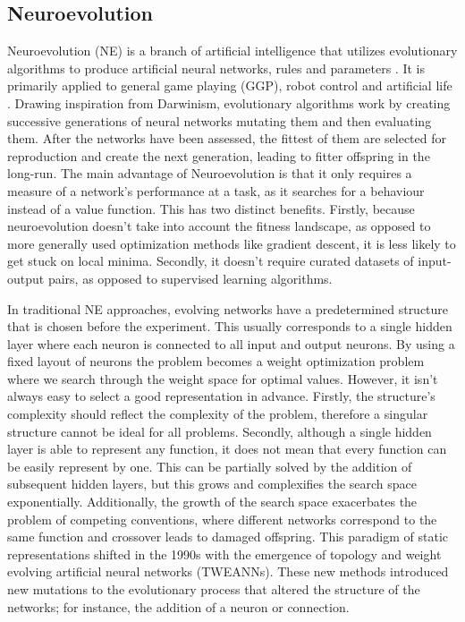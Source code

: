 \documentclass[letterpaper, 12pt]{article}
\begin{document}
\subsection*{Neuroevolution}
Neuroevolution (NE) is a branch of artificial intelligence that utilizes evolutionary
algorithms to produce artificial neural networks, rules and parameters \cite{neuro19}.
It is primarily applied to general game playing (GGP), robot control and artificial life
\cite{neurogames}. Drawing inspiration from Darwinism, evolutionary algorithms work by
creating successive generations of neural networks mutating them and then evaluating
them. After the networks have been assessed, the fittest of them are selected for
reproduction and create the next generation, leading to fitter offspring in the
long-run. The main advantage of Neuroevolution is that it only requires a measure of a
network's performance at a task, as it searches for a behaviour instead of a value
function. This has two distinct benefits. Firstly, because neuroevolution doesn't take
into account the fitness landscape, as opposed to more generally used optimization
methods like gradient descent, it is less likely to get stuck on local minima. Secondly,
it doesn't require curated datasets of input-output pairs, as opposed to supervised
learning algorithms.

In traditional NE approaches, evolving networks have a predetermined structure that is
chosen before the experiment. This usually corresponds to a single hidden layer where
each neuron is connected to all input and output neurons. By using a fixed layout of
neurons the problem becomes a weight optimization problem where we search through the
weight space for optimal values. However, it isn't always easy to select a good
representation in advance. Firstly, the structure's complexity should reflect the
complexity of the problem, therefore a singular structure cannot be ideal for all
problems. Secondly, although a single hidden layer is able to represent any function, it
does not mean that every function can be easily represent by one. This can be partially
solved by the addition of subsequent hidden layers, but this grows and complexifies the
search space exponentially. Additionally, the growth of the search space exacerbates the
problem of competing conventions, where different networks correspond to the same
function and crossover leads to damaged offspring. This paradigm of static
representations shifted in the 1990s with the emergence of topology and weight evolving
artificial neural networks (TWEANNs). These new methods introduced new mutations to the
evolutionary process that altered the structure of the networks; for instance, the
addition of a neuron or connection.
\end{document}
